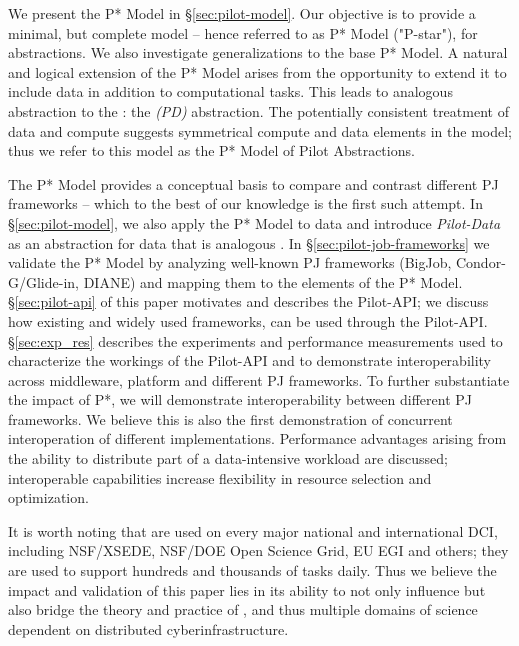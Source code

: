 \documentclass[conference]{IEEEtran}
\begin{document}


We present the P* Model in \S\ref{sec:pilot-model}. Our objective is
to provide a minimal, but complete model -- hence referred to as P*
Model ("P-star"), for \pilot abstractions. We also investigate
generalizations to the base P* Model.  A natural and logical extension
of the P* Model arises from the opportunity to extend it to include
data in addition to computational tasks. This leads to analogous
abstraction to the \pilotjob: the \emph{\pilotdata (PD)}
abstraction. The potentially consistent treatment of data and compute
suggests symmetrical compute and data elements in the model; thus we
refer to this model as the P* Model of Pilot Abstractions.

The P* Model provides a conceptual basis to compare and contrast
different PJ frameworks -- which to the best of our knowledge is the
first such attempt. In \S\ref{sec:pilot-model}, we also apply the P*
Model to data and introduce {\it Pilot-Data} as an abstraction for
data that is analogous \pilotjobs. In \S\ref{sec:pilot-job-frameworks}
we validate the P* Model by analyzing well-known PJ frameworks
(BigJob, Condor-G/Glide-in, DIANE) and mapping them to the elements of
the P* Model. \S\ref{sec:pilot-api} of this paper motivates and
describes the Pilot-API; we discuss how existing and widely used
\pilotjob frameworks, can be used through the
Pilot-API. \S\ref{sec:exp_res} describes the experiments and
performance measurements used to characterize the workings of the
Pilot-API and to demonstrate interoperability across middleware,
platform and different PJ frameworks. To further substantiate the
impact of P*, we will demonstrate interoperability between different
PJ frameworks. %
We believe this is also the first demonstration of concurrent
interoperation of different \pilotjob implementations. Performance
advantages arising from the ability to distribute part of a
data-intensive workload are discussed; interoperable capabilities
increase flexibility in resource selection and optimization.

It is worth noting that \pilotjobs are used on every major national
and international DCI, including NSF/XSEDE, NSF/DOE Open Science Grid,
EU EGI and others; they are used to support hundreds and thousands of
tasks daily. Thus we believe the impact and validation of this paper
lies in its ability to not only influence but also bridge the theory
and practice of \pilotjobs, and thus multiple domains of science
dependent on distributed cyberinfrastructure.
\end{document}
